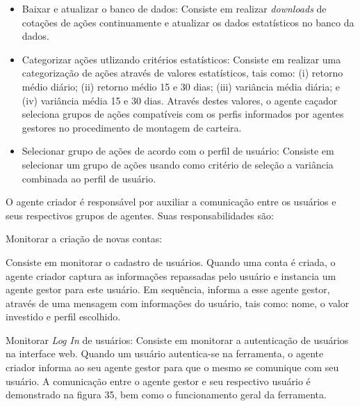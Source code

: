 \begin{description}
\begin{itemize}
\item Baixar e atualizar o banco de dados:\newline
Consiste em realizar \textit{downloads} de cotações de ações continuamente e atualizar os dados estatísticos no banco da dados. 
\item Categorizar ações utlizando critérios estatísticos:\newline
Consiste em realizar uma categorização de ações através de valores estatísticos, tais como: (i) retorno médio diário; (ii) retorno médio 15 e 30 dias; (iii) variância média diária; e (iv) variância média 15 e 30 dias. Através destes valores, o agente caçador seleciona grupos de ações compatíveis com os perfis informados por agentes gestores no procedimento de montagem de carteira.
\item Selecionar grupo de ações de acordo com o perfil de usuário:\newline
Consiste em selecionar um grupo de ações usando como critério de seleção a variância combinada ao perfil de usuário.
\end{itemize}

\item[Agente criador (\textit{creator}):]
 O agente criador é responsável por auxiliar a comunicação entre os usuários e seus respectivos grupos de agentes. Suas responsabilidades são: 

\item Monitorar a criação de novas contas:\newline

Consiste em monitorar o cadastro de usuários. Quando uma conta é criada, o agente criador captura as informações repassadas pelo usuário e instancia um agente gestor para este usuário. Em sequência, informa a esse agente gestor, através de uma mensagem com informações do usuário, tais como: nome, o valor investido e perfil escolhido.

\item Monitorar \textit{Log In} de usuários:\newline
Consiste em monitorar a autenticação de usuários na interface web. Quando um usuário autentica-se na ferramenta, o agente criador informa ao seu agente gestor para que o mesmo se comunique com seu usuário. A comunicação entre o agente gestor e seu respectivo usuário é demonstrado na figura 35, bem como o funcionamento geral da ferramenta.

\end{description}

